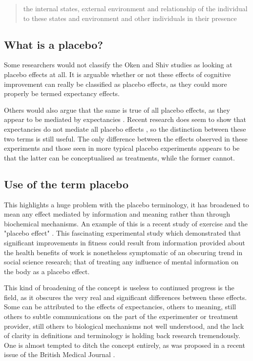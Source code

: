 \begin{quotation}
   the internal states, external environment and relationship of the individual to these states and environment and other individuals in their presence 
\end{quotation}

\subsection{What is a placebo?}
\label{sec:what-placebo}



Some researchers would not classify the Oken and Shiv studies as looking at placebo effects at all. It is arguable whether or not these effects of cognitive improvement can really be classified as placebo effects, as they could more properly be termed expectancy effects. 

Others would also argue that the same is true of all placebo effects, as they appear to be mediated by expectancies \cite{Kirsch1985, Kirsch1997,Montgomery1997}. Recent research does seem to show that expectancies do not mediate all placebo effects \cite{Benedetti2003a}, so the distinction between these two terms is still useful.  The only difference between the effects observed in these experiments and those seen in more typical placebo experiments appears to be that the latter can be conceptualised as treatments, while the former cannot. 

\subsection{Use of the term placebo}
\label{sec:use-term-placebo}



This highlights a huge problem with the placebo terminology, it has broadened to mean any effect mediated by information and meaning rather than through biochemical mechanisms. An example of this is a recent study of exercise and the "placebo effect" \cite{Crum2007}. This fascinating experimental study which demonstrated that significant improvements in fitness could result from information provided about the health benefits of work is nonetheless symptomatic of an obscuring trend in social science research; that of treating any influence of mental information on the body as a placebo effect. 

This kind of broadening of the concept is  useless to continued progress is the field, as it obscures the very real and significant differences between these effects. Some can be attributed to the effects of expectancies, others to meaning, still others to subtle communications on the part of the experimenter or treatment provider, still others to biological mechanisms not well understood, and the lack of clarity in definitions and terminology is holding back research tremendously. One is almost tempted to ditch the concept entirely, as was proposed in a recent issue of the British Medical Journal \cite{nunn2009s}. 

